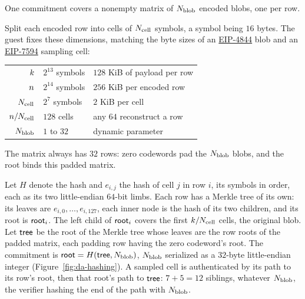 One commitment covers a nonempty matrix of $N_{\mathrm{blob}}$ encoded blobs, one per row.

Split each encoded row into cells of $N_{\mathrm{cell}}$ symbols, a symbol being $16$ bytes. The guest fixes these dimensions, matching the byte sizes of an \href{https://eips.ethereum.org/EIPS/eip-4844}{EIP-4844} blob and an \href{https://eips.ethereum.org/EIPS/eip-7594}{EIP-7594} sampling cell:
\begin{center}
\begin{tabular}{@{}rll@{}}
\hline
$k$ & $2^{13}$ symbols & $128$ KiB of payload per row\\
$n$ & $2^{14}$ symbols & $256$ KiB per encoded row\\
$N_{\mathrm{cell}}$ & $2^7$ symbols & $2$ KiB per cell\\
$n/N_{\mathrm{cell}}$ & $128$ cells & any $64$ reconstruct a row\\
$N_{\mathrm{blob}}$ & $1$ to $32$ & dynamic parameter\\
\hline
\end{tabular}
\end{center}
The matrix always has $32$ rows: zero codewords pad the $N_{\mathrm{blob}}$ blobs, and the root binds this padded matrix.

Let $H$ denote the hash and $e_{i,j}$ the hash of cell $j$ in row $i$, its symbols in order, each as its two little-endian $64$-bit limbs. Each row has a Merkle tree of its own: its leaves are $e_{i,0},\ldots,e_{i,127}$, each inner node is the hash of its two children, and its root is $\mathsf{root}_{i}$. The left child of $\mathsf{root}_{i}$ covers the first $k/N_{\mathrm{cell}}$ cells, the original blob. Let $\mathsf{tree}$ be the root of the Merkle tree whose leaves are the row roots of the padded matrix, each padding row having the zero codeword's root. The commitment is $\mathsf{root}=H(\mathsf{tree},N_{\mathrm{blob}})$, $N_{\mathrm{blob}}$ serialized as a $32$-byte little-endian integer (Figure~\ref{fig:da-hashing}). A sampled cell is authenticated by its path to its row's root, then that root's path to $\mathsf{tree}$: $7+5=12$ siblings, whatever $N_{\mathrm{blob}}$, the verifier hashing the end of the path with $N_{\mathrm{blob}}$.

